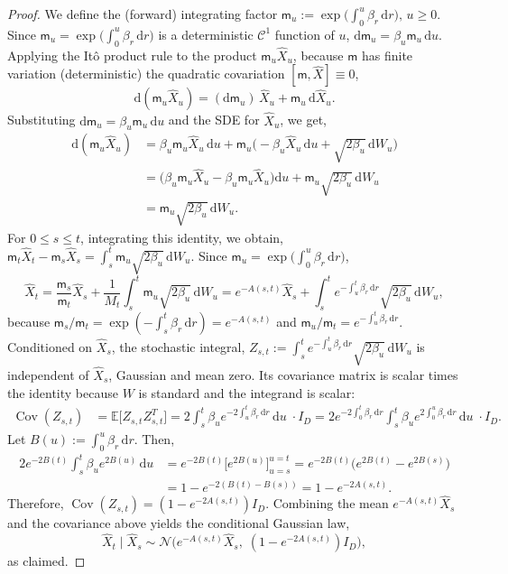 \documentclass[10pt,a4paper]{amsart}
\newcommand{\hX}{ \widehat{X}}
\begin{document}
\begin{proof}
We define the (forward) integrating factor
\(\mathsf{m}_u:=\exp\!\Big(\int_0^u \beta_r\,\mathrm dr\Big), \, u\ge0.\) Since $\mathsf{m}_u=\exp\big(\int_0^u\beta_r\,\mathrm dr\big)$ is a deterministic $\mathscr{C}^1$ function of $u$,
\( \mathrm d\mathsf{m}_u=\beta_u \mathsf{m}_u\,\mathrm du.\) Applying the It\^o product rule to the product $\mathsf{m}_u\widehat X_u$,  because $\mathsf{m}$ has finite variation (deterministic) the quadratic covariation $[\mathsf{m},\widehat X]\equiv0$, 
\[
\mathrm d(\mathsf{m}_u\widehat X_u)
= (\mathrm d\mathsf{m}_u)\,\widehat X_u + \mathsf{m}_u\,\mathrm d\widehat X_u.
\]
Substituting $\mathrm d\mathsf{m}_u=\beta_u \mathsf{m}_u\,\mathrm du$ and the SDE for $\widehat X_u$, we get,
\[
\begin{aligned}
\mathrm d(\mathsf{m}_u\widehat X_u)
&= \beta_u \mathsf{m}_u \widehat X_u\,\mathrm du
   + \mathsf{m}_u\big(-\beta_u\widehat X_u\,\mathrm du + \sqrt{2\beta_u}\,\mathrm dW_u\big) \\
&= \big(\beta_u \mathsf{m}_u\widehat X_u - \beta_u \mathsf{m}_u\widehat X_u\big)\mathrm du
   + \mathsf{m}_u\sqrt{2\beta_u}\,\mathrm dW_u \\
&= \mathsf{m}_u\sqrt{2\beta_u}\,\mathrm dW_u.
\end{aligned}
\]
 For $0\le s\le t$, integrating this identity, we obtain,
\(\mathsf{m}_t\widehat X_t - \mathsf{m}_s\widehat X_s = \int_s^t \mathsf{m}_u\sqrt{2\beta_u}\,\mathrm dW_u.\)
Since $\mathsf{m}_u=\exp\big(\int_0^u\beta_r\,\mathrm dr\big)$,
\[
\widehat X_t
= \frac{\mathsf{m}_s}{\mathsf{m}_t}\widehat X_s + \frac{1}{M_t}\int_s^t \mathsf{m}_u\sqrt{2\beta_u}\,\mathrm dW_u
= e^{-A(s,t)}\widehat X_s + \int_s^t e^{-\int_u^t\beta_r\,\mathrm dr}\sqrt{2\beta_u}\,\mathrm dW_u,
\]
because $\mathsf{m}_s/\mathsf{m}_t=\exp(-\int_s^t\beta_r\,\mathrm dr)=e^{-A(s,t)}$ and $\mathsf{m}_u/\mathsf{m}_t=e^{-\int_u^t\beta_r\,\mathrm dr}$. Conditioned on  $\widehat X_s$, the stochastic integral,
\(Z_{s,t}:=\int_s^t e^{-\int_u^t\beta_r\,\mathrm dr}\sqrt{2\beta_u}\,\mathrm dW_u\)
is independent of $\hX_s$, Gaussian and mean zero. Its covariance matrix is scalar times the identity because $W$ is standard and the integrand is scalar:
\[
\begin{aligned}
\operatorname{Cov}(Z_{s,t})
&= \mathbb E\big[Z_{s,t}Z_{s,t}^T\big]
= 2\int_s^t \beta_u e^{-2\int_u^t\beta_r\,\mathrm dr}\,\mathrm du\; \cdot I_D = 2 e^{-2\int_0^t\beta_r\,\mathrm dr}\int_s^t \beta_u e^{2\int_0^u\beta_r\,\mathrm dr}\,\mathrm du\; \cdot I_D.
\end{aligned}
\]
Let $B(u):=\int_0^u\beta_r\,\mathrm dr$. Then,
\[
\begin{aligned}
2 e^{-2B(t)}\int_s^t \beta_u e^{2B(u)}\,\mathrm du
&= e^{-2B(t)}\Big[ e^{2B(u)}\Big]_{u=s}^{u=t}
= e^{-2B(t)}\big(e^{2B(t)}-e^{2B(s)}\big) \\
&= 1 - e^{-2(B(t)-B(s))} = 1 - e^{-2A(s,t)}.
\end{aligned}
\]
Therefore, $\operatorname{Cov}(Z_{s,t})=(1-e^{-2A(s,t)})I_D$. Combining the mean $e^{-A(s,t)}\widehat X_s$ and the covariance above yields the conditional Gaussian law,
\[
\widehat X_t\mid\widehat X_s \sim \mathcal N\!\big(e^{-A(s,t)}\widehat X_s,\; (1-e^{-2A(s,t)})I_D\big),
\]
as claimed.
\end{proof}
\end{document}
